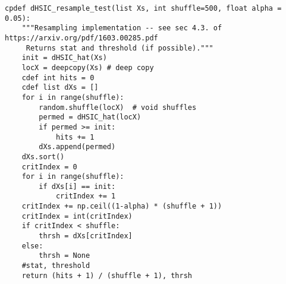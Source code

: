 \begin{lstlisting}[label={lst:cyhsic}, language=Cython, style=mystyle]
cpdef dHSIC_resample_test(list Xs, int shuffle=500, float alpha = 0.05):
    """Resampling implementation -- see sec 4.3. of https://arxiv.org/pdf/1603.00285.pdf
     Returns stat and threshold (if possible)."""
    init = dHSIC_hat(Xs)
    locX = deepcopy(Xs) # deep copy
    cdef int hits = 0
    cdef list dXs = []
    for i in range(shuffle):
        random.shuffle(locX)  # void shuffles
        permed = dHSIC_hat(locX)
        if permed >= init:
            hits += 1
        dXs.append(permed)
    dXs.sort()
    critIndex = 0
    for i in range(shuffle):
        if dXs[i] == init:
            critIndex += 1
    critIndex += np.ceil((1-alpha) * (shuffle + 1))
    critIndex = int(critIndex)
    if critIndex < shuffle:
        thrsh = dXs[critIndex]
    else:
        thrsh = None
    #stat, threshold
    return (hits + 1) / (shuffle + 1), thrsh
\end{lstlisting}

